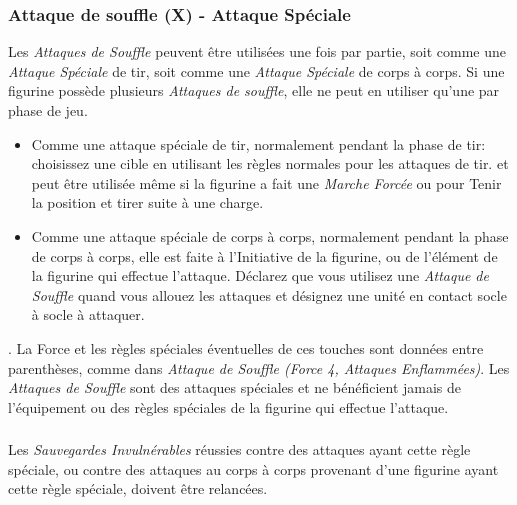 \subsubsection*{Attaque de souffle (X) - Attaque Spéciale}

Les \emph{Attaques de Souffle} peuvent être utilisées une fois par partie, soit comme une \emph{Attaque Spéciale} de tir, soit comme une \emph{Attaque Spéciale} de corps à corps. Si une figurine possède plusieurs \emph{Attaques de souffle}, elle ne peut en utiliser qu'une par phase de jeu.
\begin{itemize}[label={-}]
\item Comme une attaque spéciale de tir, normalement pendant la phase de tir: choisissez une cible en utilisant les règles normales pour les attaques de tir.  et peut être utilisée même si la figurine a fait une \emph{Marche Forcée} ou pour Tenir la position et tirer suite à une charge.
\item Comme une attaque spéciale de corps à corps, normalement pendant la phase de corps à corps, elle est faite à l'Initiative de la figurine, ou de l'élément de la figurine qui effectue l'attaque. Déclarez que vous utilisez une \emph{Attaque de Souffle} quand vous allouez les attaques et désignez une unité en contact socle à socle à attaquer.
\end{itemize}

. La Force et les règles spéciales éventuelles de ces touches sont données entre parenthèses, comme dans \emph{Attaque de Souffle (\emph{Force 4}, Attaques Enflammées)}. Les \emph{Attaques de Souffle} sont des attaques spéciales et ne bénéficient jamais de l'équipement ou des règles spéciales de la figurine qui effectue l'attaque.

\subsubsection*{}

Les \emph{Sauvegardes Invulnérables} réussies contre des attaques ayant cette règle spéciale, ou contre des attaques au corps à corps provenant d'une figurine ayant cette règle spéciale, doivent être relancées.

\subsubsection*{}

